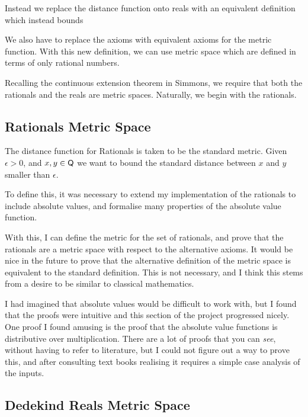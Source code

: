 \documentclass[ProjectReport]{subfiles}
\begin{document}
Instead we replace the distance function onto reals with an equivalent definition which instead bounds %

We also have to replace the axioms with equivalent axioms for the metric function. With this new definition, we can use metric space which are defined in terms of only rational numbers. 



Recalling the continuous extension theorem in Simmons, we require that both the rationals and the reals are metric spaces. Naturally, we begin with the rationals. 

\subsection{Rationals Metric Space}

The distance function for Rationals is taken to be the standard metric. Given $\epsilon > 0$, and $x , y \in \AgdaFunction{Q}$ we want to bound the standard distance between $x$ and $y$ smaller than $\epsilon$. 

To define this, it was necessary to extend my implementation of the rationals to include absolute values, and formalise many properties of the absolute value function. 


With this, I can define the metric for the set of rationals, and prove that the rationals are a metric space with respect to the alternative axioms. It would be nice in the future to prove that the alternative definition of the metric space is equivalent to the standard definition. This is not necessary, and I think this stems from a desire to be similar to classical mathematics. 

I had imagined that absolute values would be difficult to work with, but I found that the proofs were intuitive and this section of the project progressed nicely. One proof I found amusing is the proof that the absolute value functions is distributive over multiplication. There are a lot of proofs that you can \textit{see}, without having to refer to literature, but I could not figure out a way to prove this, and after consulting text books realising it requires a simple case analysis of the inputs.

\subsection{Dedekind Reals Metric Space}
\end{document}
